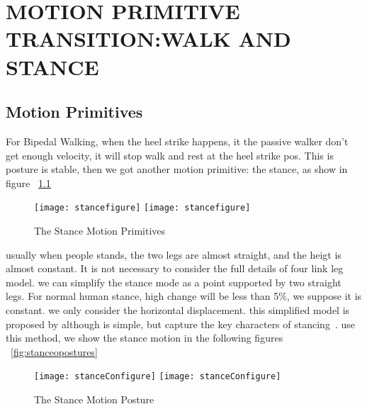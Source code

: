 
\chapter{MOTION PRIMITIVE TRANSITION:WALK AND STANCE}
\label{chap:stance}
\ifpdf
    \graphicspath{{WalkStance/WalkstanceFigs/PNG/}{WalkStance/WalkStanceFigs/PDF/}{WalkStance/WalkStanceFigs/}}
\else
    \graphicspath{{WalkStance/WalkStanceFigs/EPS/}{WalkStance/WalkStanceFigs/}}
\fi



\section{Motion Primitives}
For Bipedal Walking, when the heel strike happens, it the passive walker don't get enough velocity, it will stop walk and rest at the heel strike pos.
This is posture is stable, then we got another motion primitive: the stance, as show in figure ~\ref{fig:bipedalstance}



\begin{figure}[!htbp]
  \begin{center}
    \leavevmode
    \ifpdf
      \texttt{[image: stancefigure]}
    \else
      \texttt{[image: stancefigure]}
    \fi
    \caption{The Stance Motion Primitives}
    \label{fig:bipedalstance}
\end{center}
\end{figure}



usually when people stands, the two legs are almost straight, and the heigt is almost constant.
It is not necessary to consider the full details of four link leg model.
we can simplify the stance mode as a point supported by two straight legs. 
For normal human stance, high change will be less than 5\%, we suppose it is constant.
we only consider the horizontal displacement.
this simplified model is proposed by although is simple, but capture the key characters of stancing~\citep{stephens2009modeling}.
use this method, we show the stance motion in the following figures ~\ref{fig:stanceopostures}

\begin{figure}[!htbp]
  \begin{center}
    \leavevmode
    \ifpdf
      \texttt{[image: stanceConfigure]}
    \else
      \texttt{[image: stanceConfigure]}
    \fi
    \caption{The Stance Motion Posture}
    \label{fig:stancepostures}
\end{center}
\end{figure}


